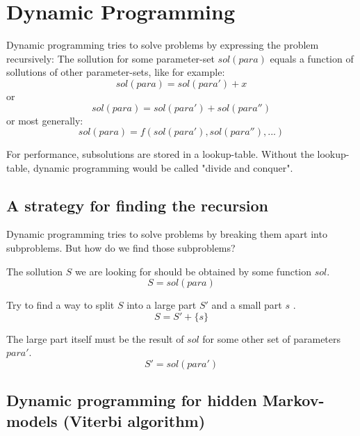 \section{Dynamic Programming}

Dynamic programming tries to solve problems by expressing the problem recursively: The sollution for some parameter-set $sol(para)$ equals a function of sollutions of other parameter-sets, like for example: 
$$ sol(para) = sol(para') + x$$
or
$$ sol(para) = sol(para') + sol(para'')$$
or most generally:
$$ sol(para) = f(sol(para'), sol(para''), ...)$$

For performance, subsolutions are stored in a lookup-table. Without the lookup-table, dynamic programming would be called "divide and conquer".


\subsection{A strategy for finding the recursion}

Dynamic programming tries to solve problems by breaking them apart into subproblems. But how do we find those subproblems?

The sollution $S$ we are looking for should be obtained by some function $sol$.
$$ S = sol(para) $$

Try to find a way to split $S$ into a large part $S'$ and a small part $s$ .
$$ S = S' + \{ s \} $$

The large part itself must be the result of $sol$ for some other set of parameters $para'$.
$$ S' = sol(para') $$


\subsection{Dynamic programming for hidden Markov-models (Viterbi algorithm)}